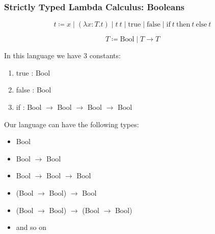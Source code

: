 \documentclass{beamer}
\newcommand{\bool}{\text{Bool}}
\newcommand{\true}{\text{true}}
\newcommand{\false}{\text{false}}
\newcommand{\ha}[3]{\text{if}\ #1\ \text{then}\ #2\ \text{else}\ #3}
\begin{document}

\begin{frame}[fragile]
  \frametitle{Strictly Typed Lambda Calculus: Booleans}

  $$
    t \coloneqq x
      \mid (\lambda x : T . t)
      \mid t\  t
      \mid \true
      \mid \false
      \mid \ha{t}{t}{t}
  $$

  $$ T \coloneqq \bool \mid T \rightarrow T $$

  In this language we have 3 constants:
  \begin{enumerate}
    \item true : Bool
    \item false : Bool
    \item if : Bool $\rightarrow$ Bool $\rightarrow$ Bool $\rightarrow$ Bool
  \end{enumerate}

  \pause

  Our language can have the following types:
  \begin{itemize}
    \item[-] Bool
    \item[-] Bool $\rightarrow$ Bool
    \item[-] Bool $\rightarrow$ Bool $\rightarrow$ Bool
    \item[-] (Bool $\rightarrow$ Bool) $\rightarrow$ Bool
    \item[-] (Bool $\rightarrow$ Bool) $\rightarrow$ (Bool $\rightarrow$ Bool)
    \item[-] and so on
  \end{itemize}
\end{frame}
\end{document}

